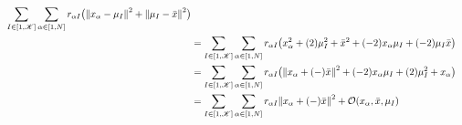\begin{frame} [t]
\begin{itemize}
{\begin{align*}
              \sum _{I \in [1, \mathscr{K}]}
              \sum _{\alpha \in [1, N]} 
              r _{\alpha I}  
              \big(
                \norm {x _{\alpha} - \mu _{I}} 
                      ^{2}
               + 
                \norm 
                 {\mu _{I} - \bar {x}} ^{2}
              \big)
            \\ & = 
              \sum _{I \in [1, \mathscr{K}]}
              \sum _{\alpha \in [1, N]} 
              r _{\alpha I} 
              \big(  
                 x _{\alpha} ^{2} 
               + (2) \mu _{I} ^{2} 
               +  \bar {x} ^{2} 
               + (-2)  x _{\alpha} \mu _{I}
               + (-2) \mu _{I} \bar {x}
              \big)
            \\ & = 
              \sum _{I \in [1, \mathscr{K}]}
              \sum _{\alpha \in [1, N]} 
              r _{\alpha I} 
              \big( 
                 \norm 
                   { x _{\alpha} 
                     + (-) \bar {x}  
                   } ^{2} 
               + (-2) x _{\alpha} \mu _{I}
               + (2) \mu _{I} ^{2} 
               + x _{\alpha} 
              \big) 
            \\ & = 
              \sum _{I \in [1, \mathscr{K}]}
              \sum _{\alpha \in [1, N]} 
              r _{\alpha I} 
                 \norm 
                   { x _{\alpha} 
                     + (-) \bar {x}  
                   } ^{2}
                  + \mathcal {O} 
                     ( x _{\alpha}, 
                       \bar {x}, \mu _{I} 
                     ) 
        \end{align*}
        }
\end{itemize}  
\end{frame}


